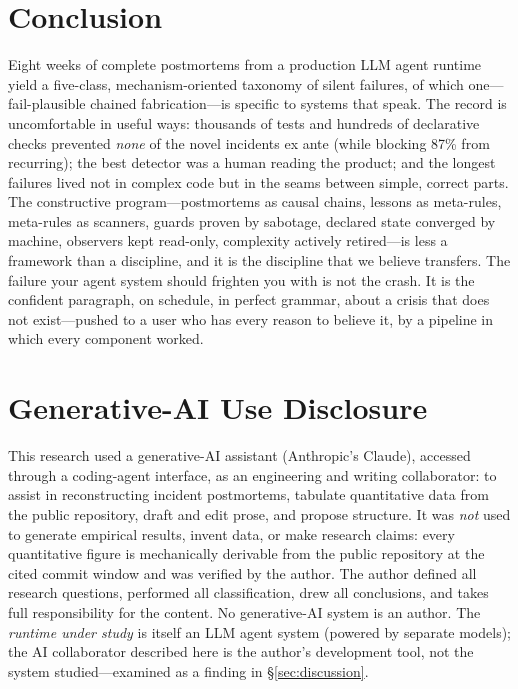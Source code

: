 \documentclass[conference]{IEEEtran}
\begin{document}
\section{Conclusion}
Eight weeks of complete postmortems from a production LLM agent runtime
yield a five-class, mechanism-oriented taxonomy of silent failures, of
which one---fail-plausible chained fabrication---is specific to systems
that speak. The record is uncomfortable in useful ways: thousands of tests
and hundreds of declarative checks prevented \emph{none} of the novel
incidents ex ante (while blocking 87\% from recurring); the best detector
was a human reading the product; and the longest failures lived not in
complex code but in the seams between simple, correct parts. The
constructive program---postmortems as causal chains, lessons as
meta-rules, meta-rules as scanners, guards proven by sabotage, declared
state converged by machine, observers kept read-only, complexity actively
retired---is less a framework than a discipline, and it is the discipline
that we believe transfers. The failure your agent system should frighten
you with is not the crash. It is the confident paragraph, on schedule, in
perfect grammar, about a crisis that does not exist---pushed to a user who
has every reason to believe it, by a pipeline in which every component
worked.

\section*{Generative-AI Use Disclosure}
This research used a generative-AI assistant (Anthropic's Claude), accessed
through a coding-agent interface, as an engineering and writing
collaborator: to assist in reconstructing incident postmortems, tabulate
quantitative data from the public repository, draft and edit prose, and
propose structure. It was \emph{not} used to generate empirical results,
invent data, or make research claims: every quantitative figure is
mechanically derivable from the public repository at the cited commit
window and was verified by the author. The author defined all research
questions, performed all classification, drew all conclusions, and takes
full responsibility for the content. No generative-AI system is an author.
The \emph{runtime under study} is itself an LLM agent system (powered by
separate models); the AI collaborator described here is the author's
development tool, not the system studied---examined as a finding in
\S\ref{sec:discussion}.
\end{document}
